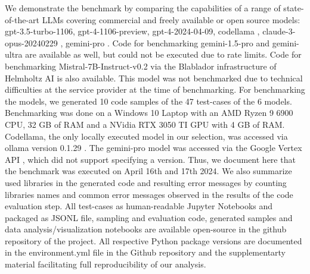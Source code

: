 \documentclass{ecai}
\begin{document}
We demonstrate the benchmark by comparing the capabilities of a range of state-of-the-art LLMs covering commercial and freely available or open source models: gpt-3.5-turbo-1106, gpt-4-1106-preview, gpt-4-2024-04-09, codellama \citep{roziere2024code}, claude-3-opus-20240229 \citep{anthropic2024claude}, gemini-pro \citep{geminiteam2024gemini}. Code for benchmarking gemini-1.5-pro and gemini-ultra are available as well, but could not be executed due to rate limits. Code for benchmarking Mistral-7B-Instruct-v0.2 \citep{jiang2023mistral} via the Blablador infrastructure of Helmholtz AI is also available. This model was not benchmarked due to technical difficulties at the service provider at the time of benchmarking.
For benchmarking the models, we generated 10 code samples of the 47 test-cases of the 6 models. Benchmarking was done on a Windows 10 Laptop with an AMD Ryzen 9 6900 CPU, 32 GB of RAM and a NVidia RTX 3050 TI GPU with 4 GB of RAM. Codellama, the only locally executed model in our selection, was accessed via ollama version 0.1.29 \citep{ollama2024windows}. The gemini-pro model was accessed via the Google Vertex API \citep{google2024vertex}, which did not support specifying a version. Thus, we document here that the benchmark was executed on April 16th and 17th 2024. 
We also summarize used libraries in the generated code and resulting error messages by counting libraries names and common error messages observed in the results of the code evaluation step.
All test-cases as human-readable Jupyter Notebooks and packaged as JSONL file, sampling and evaluation code, generated samples and data analysis/visualization notebooks are available open-source in the github repository of the project. All respective Python package versions are documented in the environment.yml file in the Github repository and the supplementarty material facilitating full reproducibility of our analysis.
\end{document}
